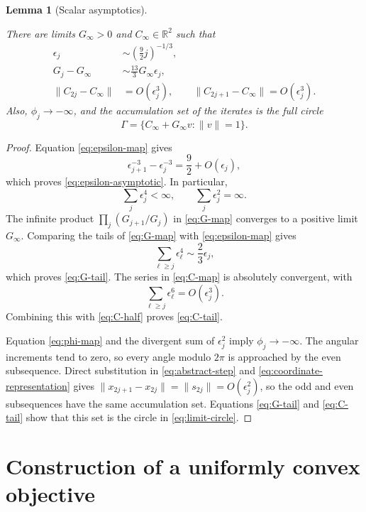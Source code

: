 \documentclass[11pt]{article}
\newtheorem{lemma}[theorem]{Lemma}
\newcommand{\R}{\mathbb R}
\begin{document}
\begin{lemma}[Scalar asymptotics]\label{lem:scalar-asymptotics}



There are limits $G_\infty>0$ and $C_\infty\in\R^2$ such that
\begin{align}
\epsilon_j&\sim\left(\frac92j\right)^{-1/3},
\label{eq:epsilon-asymptotic}\\
G_j-G_\infty&\sim\frac{13}{3}G_\infty\epsilon_j,
\label{eq:G-tail}\\
\|C_{2j}-C_\infty\|&=O(\epsilon_j^3),
\qquad
\|C_{2j+1}-C_\infty\|=O(\epsilon_j^3).
\label{eq:C-tail}
\end{align}
Also, $\phi_j\to-\infty$, and the accumulation set of the iterates is
the full circle
\begin{equation}\label{eq:limit-circle}
\Gamma=\{C_\infty+G_\infty v:\|v\|=1\}.
\end{equation}

\end{lemma}

\begin{proof}
Equation \eqref{eq:epsilon-map} gives
\[
\epsilon_{j+1}^{-3}-\epsilon_j^{-3}
=\frac92+O(\epsilon_j),
\]
which proves \eqref{eq:epsilon-asymptotic}.  In particular,
\[
\sum_j\epsilon_j^4<\infty,
\qquad
\sum_j\epsilon_j^2=\infty.
\]
The infinite product $\prod_j(G_{j+1}/G_j)$ in \eqref{eq:G-map}
converges to a positive limit $G_\infty$.  Comparing the tails of
\eqref{eq:G-map} with
\eqref{eq:epsilon-map} gives
\[
\sum_{\ell\ge j}\epsilon_\ell^4\sim\frac23\epsilon_j,
\]
which proves \eqref{eq:G-tail}.  The series in \eqref{eq:C-map} is absolutely
convergent, with
\[
\sum_{\ell\ge j}\epsilon_\ell^6=O(\epsilon_j^3).
\]
Combining this with \eqref{eq:C-half} proves \eqref{eq:C-tail}.

Equation \eqref{eq:phi-map} and the divergent sum of $\epsilon_j^2$ imply
$\phi_j\to-\infty$.  The angular increments tend to zero, so every angle
modulo $2\pi$ is approached by the even subsequence.  Direct substitution in
\eqref{eq:abstract-step} and \eqref{eq:coordinate-representation} gives
$\|x_{2j+1}-x_{2j}\|=\|s_{2j}\|=O(\epsilon_j^2)$, so the odd and even
subsequences have the same accumulation set.  Equations \eqref{eq:G-tail} and
\eqref{eq:C-tail} show that this set is the circle in
\eqref{eq:limit-circle}.
\end{proof}

\section{Construction of a uniformly convex objective}
\label{sec:global-objective}
\end{document}
